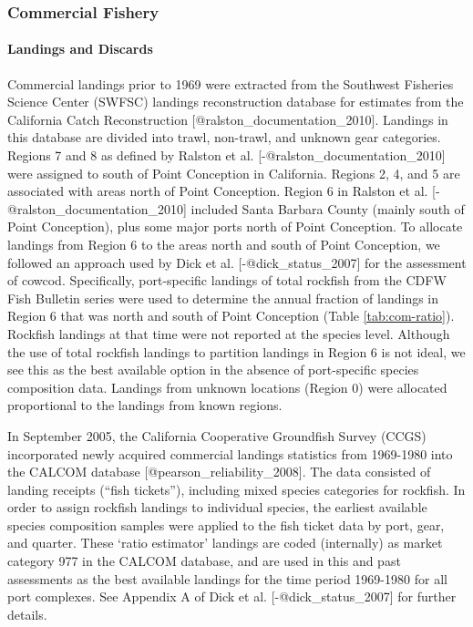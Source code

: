 \documentclass[11pt,
  letterpaper,
]{article}
\begin{document}
\subsubsection{Commercial Fishery}\label{commercial-fishery}

\paragraph{Landings and Discards}\label{landings-and-discards}

\hfill\break

Commercial landings prior to 1969 were extracted from the Southwest Fisheries Science Center (SWFSC) landings reconstruction database for estimates from the California Catch Reconstruction {[}@ralston\_documentation\_2010{]}. Landings in this database are divided into trawl, non-trawl, and unknown gear categories. Regions 7 and 8 as defined by Ralston et al. {[}-@ralston\_documentation\_2010{]} were assigned to south of Point Conception in California. Regions 2, 4, and 5 are associated with areas north of Point Conception. Region 6 in Ralston et al. {[}-@ralston\_documentation\_2010{]} included Santa Barbara County (mainly south of Point Conception), plus some major ports north of Point Conception. To allocate landings from Region 6 to the areas north and south of Point Conception, we followed an approach used by Dick et al. {[}-@dick\_status\_2007{]} for the assessment of cowcod. Specifically, port-specific landings of total rockfish from the CDFW Fish Bulletin series were used to determine the annual fraction of landings in Region 6 that was north and south of Point Conception (Table \ref{tab:com-ratio}). Rockfish landings at that time were not reported at the species level. Although the use of total rockfish landings to partition landings in Region 6 is not ideal, we see this as the best available option in the absence of port-specific species composition data. Landings from unknown locations (Region 0) were allocated proportional to the landings from known regions.

In September 2005, the California Cooperative Groundfish Survey (CCGS) incorporated newly acquired commercial landings statistics from 1969-1980 into the CALCOM database {[}@pearson\_reliability\_2008{]}. The data consisted of landing receipts (``fish tickets''), including mixed species categories for rockfish. In order to assign rockfish landings to individual species, the earliest available species composition samples were applied to the fish ticket data by port, gear, and quarter. These `ratio estimator' landings are coded (internally) as market category 977 in the CALCOM database, and are used in this and past assessments as the best available landings for the time period 1969-1980 for all port complexes. See Appendix A of Dick et al. {[}-@dick\_status\_2007{]} for further details.
\end{document}

